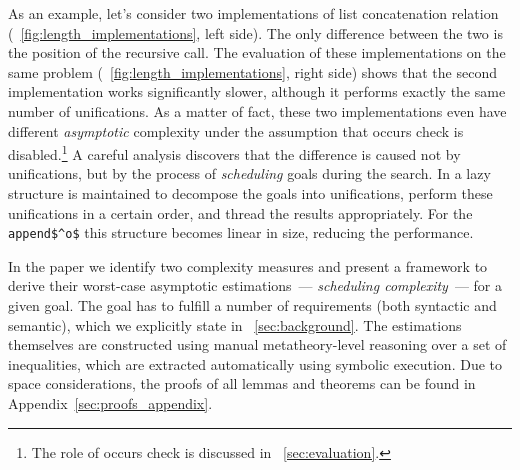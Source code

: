 As an example, let's consider two implementations of list concatenation relation (\figureword~\ref{fig:length_implementations}, left side). The only difference between the two is
the position of the recursive call.
The evaluation of these implementations on the same problem (\figureword~\ref{fig:length_implementations}, right side) shows that the second implementation works significantly
slower,
although it performs exactly the same number of unifications. As a matter of fact, these two implementations even have different \emph{asymptotic} complexity under the assumption
that occurs check is disabled.\footnote{The role of occurs check is discussed in
\sectionword~\ref{sec:evaluation}.}
A careful analysis discovers that the difference is caused not by unifications, but by the process of \emph{scheduling} goals during the search. In \mK a
lazy structure is maintained to decompose the goals into unifications, perform these unifications in a certain order, and thread the results appropriately. For the \lstinline|append$^o$|
this structure becomes linear in size, reducing the performance.

In the paper we identify two complexity measures and present a framework to derive their worst-case asymptotic estimations~--- \emph{scheduling complexity}~---
for a given goal. The goal has to fulfill a number of requirements (both syntactic and semantic), which we explicitly state in \sectionword~\ref{sec:background}. The estimations
themselves are constructed using manual metatheory-level reasoning over a set of inequalities, which are extracted automatically using symbolic execution.
Due to space considerations, the proofs of all lemmas and theorems can be found in Appendix~\ref{sec:proofs_appendix}.


